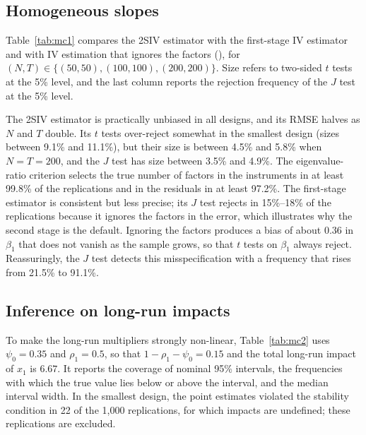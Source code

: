 \subsection{Homogeneous slopes}

Table~\ref{tab:mc1} compares the 2SIV estimator with the first-stage IV
estimator and with IV estimation that ignores the factors
(), for $(N,T)\in\{(50,50),(100,100),(200,200)\}$. Size
refers to two-sided $t$ tests at the 5\% level, and the last column reports
the rejection frequency of the $J$ test at the 5\% level.

\begin{table}[t!]
\centering\scriptsize

\caption{Homogeneous slopes: bias, root mean squared error, and size (\%) of
5\% $t$ tests for $\psi_0=0.3$, $\rho_1=0.4$, $\beta_1=1$, and rejection
frequency (\%) of the $J$ test. 1{,}000 replications.}
\label{tab:mc1}
\end{table}

The 2SIV estimator is practically unbiased in all designs, and its RMSE
halves as $N$ and $T$ double. Its $t$ tests over-reject somewhat in the
smallest design (sizes between 9.1\% and 11.1\%), but their size is between
4.5\% and 5.8\% when $N=T=200$, and the $J$ test has size between 3.5\% and
4.9\%. The eigenvalue-ratio criterion selects the true number of factors in
the instruments in at least 99.8\% of the replications and in the residuals
in at least 97.2\%. The first-stage estimator is consistent but less
precise; its $J$ test rejects in 15\%--18\% of the replications because it
ignores the factors in the error, which illustrates why the second stage is
the default. Ignoring the factors produces a bias of about 0.36 in
$\beta_1$ that does not vanish as the sample grows, so that $t$ tests on
$\beta_1$ always reject. Reassuringly, the $J$ test detects this
misspecification with a frequency that rises from 21.5\% to 91.1\%.

\subsection{Inference on long-run impacts}

To make the long-run multipliers strongly non-linear, Table~\ref{tab:mc2}
uses $\psi_0=0.35$ and $\rho_1=0.5$, so that $1-\rho_1-\psi_0=0.15$ and the
total long-run impact of $x_1$ is $6.67$. It reports the coverage of
nominal 95\% intervals, the frequencies with which the true value lies below
or above the interval, and the median interval width. In the smallest
design, the point estimates violated the stability condition in 22 of the
1{,}000 replications, for which impacts are undefined; these replications are
excluded.

